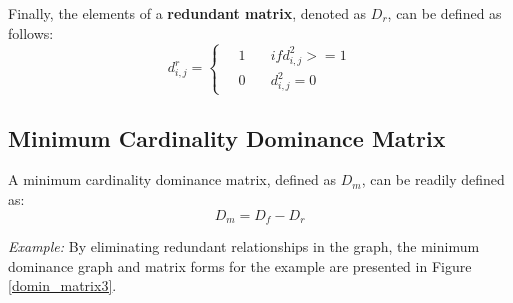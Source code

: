 \documentclass[12pt,english]{report}
\begin{document}
Finally, the elements of a \textbf{redundant matrix}, denoted as $ D_r$, can be defined as follows:
\begin{equation}
d^{r}_{i,j} =
  \begin{cases}
  \quad  1   & \quad if d^{2}_{i,j} >= 1 \\
  \quad  0  & \quad d^{2}_{i,j} = 0 
  \end{cases}   
\end{equation}

\subsection{Minimum Cardinality Dominance Matrix}
A minimum cardinality dominance matrix, defined as $D_m$, can be readily defined as: $$D_m = D_f - D_r $$

\vspace{0.15in}
\noindent \textit{Example:} By eliminating redundant relationships in the graph, the minimum dominance graph and matrix forms for the example are presented in Figure \ref{domin_matrix3}.

\begin{figure}
    \begin{floatrow}
    \capbtabbox{%
    \begin{tabular}{l|llllll}
        & 1 & 2 & 3 & 4 & 5 & 6 \\ \hline
        1 & 0 & 0 & 0 & 0 & 0 & 0 \\
        2 & 1 & 0 & 0 & 1 & 1 & 0 \\
        3 & 0 & 1 & 0 & 0 & 0 & 0 \\
        4 & 0 & 0 & 0 & 0 & 0 & 0 \\
        5 & 0 & 0 & 0 & 0 & 0 & 0 \\
        6 & 0 & 1 & 0 & 0 & 0 & 0
    \end{tabular}
        \label{domin_matrix3}%
    }{%
    \caption{Minimum dominance in matrix form}%
    \label{redundant2}
}
\end{floatrow}
\end{figure}
\end{document}
